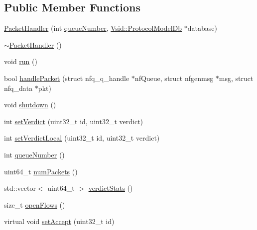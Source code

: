 \subsection*{Public Member Functions}
\begin{DoxyCompactItemize}
\item 
\hyperlink{class_vsid_netfilter_1_1_packet_handler_ad5cc80ce9ffd9d456d4578ddf2bc957c}{Packet\-Handler} (int \hyperlink{class_vsid_netfilter_1_1_packet_handler_a0ae07d1e28782fae0302f9e09e3dbf58}{queue\-Number}, \hyperlink{class_vsid_1_1_protocol_model_db}{Vsid\-::\-Protocol\-Model\-Db} $\ast$database)
\item 
\hyperlink{class_vsid_netfilter_1_1_packet_handler_a8630d1f47ddece6dfb17b85faf564243}{$\sim$\-Packet\-Handler} ()
\item 
void \hyperlink{class_vsid_netfilter_1_1_packet_handler_a351a43a68f29a0f19a7baccebe1397e9}{run} ()
\item 
bool \hyperlink{class_vsid_netfilter_1_1_packet_handler_a348aa5a48468fd46ec5ecff507d51e24}{handle\-Packet} (struct nfq\-\_\-q\-\_\-handle $\ast$nf\-Queue, struct nfgenmsg $\ast$msg, struct nfq\-\_\-data $\ast$pkt)
\item 
void \hyperlink{class_vsid_netfilter_1_1_packet_handler_acba4a3d934d515a3a867c008b3c909a7}{shutdown} ()
\item 
int \hyperlink{class_vsid_netfilter_1_1_packet_handler_abb5ca3f313ceaed495dd06ce56bdf849}{set\-Verdict} (uint32\-\_\-t id, uint32\-\_\-t verdict)
\item 
int \hyperlink{class_vsid_netfilter_1_1_packet_handler_a579cb580e2801acc62e56336b59242c4}{set\-Verdict\-Local} (uint32\-\_\-t id, uint32\-\_\-t verdict)
\item 
int \hyperlink{class_vsid_netfilter_1_1_packet_handler_a0ae07d1e28782fae0302f9e09e3dbf58}{queue\-Number} ()
\item 
uint64\-\_\-t \hyperlink{class_vsid_netfilter_1_1_packet_handler_a1d9601d06fe28b986213d951645f90e9}{num\-Packets} ()
\item 
std\-::vector$<$ uint64\-\_\-t $>$ \hyperlink{class_vsid_netfilter_1_1_packet_handler_aa73cd1027b67da5a9b4526a08065decf}{verdict\-Stats} ()
\item 
size\-\_\-t \hyperlink{class_vsid_netfilter_1_1_packet_handler_ad0ecdcdf9a4aaa5ea4a55a404b43ef12}{open\-Flows} ()
\item 
virtual void \hyperlink{class_vsid_netfilter_1_1_packet_handler_a40ff7c9f8bdbfa5bfe6b1ca94edd2f04}{set\-Accept} (uint32\-\_\-t id)
\item 

\end{DoxyCompactItemize}
